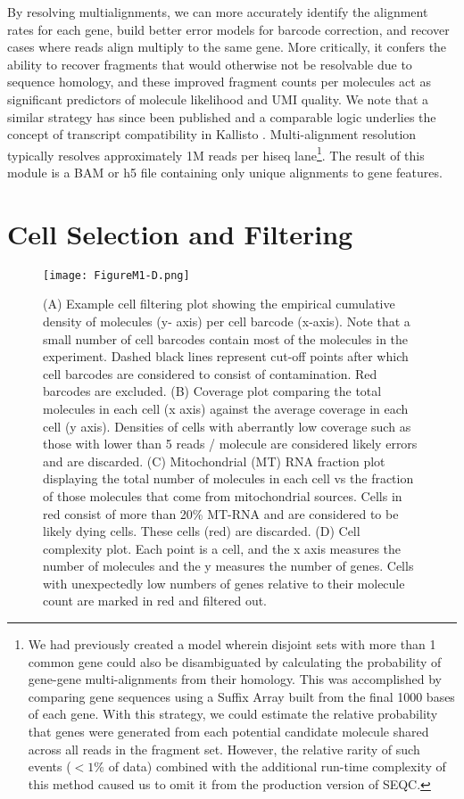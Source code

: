 By resolving multialignments, we can more accurately identify the alignment rates for each gene, build better error models for barcode correction, and recover cases where reads align multiply to the same gene. 
More critically, it confers the ability to recover fragments that would otherwise not be resolvable due to sequence homology, and these improved fragment counts per molecules act as significant predictors of molecule likelihood and UMI quality. 
We note that a similar strategy has since been published \citep{Klein2015} and a comparable logic underlies the concept of transcript compatibility in Kallisto \citep{Bray2016}.
Multi-alignment resolution typically resolves approximately 1M reads per hiseq lane\footnote{We had previously created a model wherein disjoint sets with more than 1 common gene could also be disambiguated by calculating the probability of gene-gene multi-alignments from their homology. This was accomplished by comparing gene sequences using a Suffix Array built from the final 1000 bases of each gene. With this strategy, we could estimate the relative probability that genes were generated from each potential candidate molecule shared across all reads in the fragment set. However, the relative rarity of such events ($<1\%$ of data) combined with the additional run-time complexity of this method caused us to omit it from the production version of SEQC\@.}. 
The result of this module is a BAM or h5 file containing only unique alignments to gene features.
 
\section{Cell Selection and Filtering}

\begin{figure}
\centering
\texttt{[image: FigureM1-D.png]}
\caption{(A) Example cell filtering plot showing the empirical cumulative density of molecules (y- axis) per cell barcode (x-axis). Note that a small number of cell barcodes contain most of the molecules in the experiment. Dashed black lines represent cut-off points after which cell barcodes are considered to consist of contamination. Red barcodes are excluded.  
(B) Coverage plot comparing the total molecules in each cell (x axis) against the average coverage in each cell (y axis). Densities of cells with aberrantly low coverage such as those with lower than 5 reads / molecule are considered likely errors and are discarded.  
(C) Mitochondrial (MT) RNA fraction plot displaying the total number of molecules in each cell vs the fraction of those molecules that come from mitochondrial sources. Cells in red consist of more than 20\% MT-RNA and are considered to be likely dying cells.  These cells (red) are discarded. 
(D) Cell complexity plot. Each point is a cell, and the x axis measures the number of molecules and the y measures the number of genes. Cells with unexpectedly low numbers of genes relative to their molecule count are marked in red and filtered out.}
\label{fig:m1d}
\end{figure}

